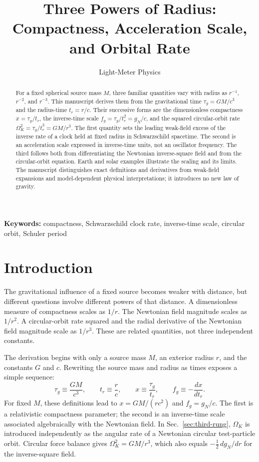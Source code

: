 \documentclass[12pt]{article}
\title{Three Powers of Radius:\\
Compactness, Acceleration Scale, and Orbital Rate}
\author{Light-Meter Physics}
\date{}
\begin{document}
\maketitle

\begin{abstract}
For a fixed spherical source mass $M$, three familiar quantities vary with radius as $r^{-1}$, $r^{-2}$, and $r^{-3}$. This manuscript derives them from the gravitational time $\tau_g=GM/c^3$ and the radius-time $t_r=r/c$. Their successive forms are the dimensionless compactness $x=\tau_g/t_r$, the inverse-time scale $f_g=\tau_g/t_r^2=g_N/c$, and the squared circular-orbit rate $\Omega_K^2=\tau_g/t_r^3=GM/r^3$. The first quantity sets the leading weak-field excess of the inverse rate of a clock held at fixed radius in Schwarzschild spacetime. The second is an acceleration scale expressed in inverse-time units, not an oscillator frequency. The third follows both from differentiating the Newtonian inverse-square field and from the circular-orbit equation. Earth and solar examples illustrate the scaling and its limits. The manuscript distinguishes exact definitions and derivatives from weak-field expansions and model-dependent physical interpretations; it introduces no new law of gravity.
\end{abstract}

\noindent\textbf{Keywords:} compactness, Schwarzschild clock rate, inverse-time scale, circular orbit, Schuler period

\section{Introduction}
\label{sec:introduction}

The gravitational influence of a fixed source becomes weaker with distance, but different questions involve different powers of that distance. A dimensionless measure of compactness scales as $1/r$. The Newtonian field magnitude scales as $1/r^2$. A circular-orbit rate squared and the radial derivative of the Newtonian field magnitude scale as $1/r^3$. These are related quantities, not three independent constants.

The derivation begins with only a source mass $M$, an exterior radius $r$, and the constants $G$ and $c$. Rewriting the source mass and radius as times exposes a simple sequence:
\begin{equation}
  \tau_g\equiv\frac{GM}{c^3},
  \qquad
  t_r\equiv\frac{r}{c},
  \qquad
  x\equiv\frac{\tau_g}{t_r},
  \qquad
  f_g\equiv-\frac{dx}{dt_r}.
  \label{eq:sequence-definitions}
\end{equation}
For fixed $M$, these definitions lead to $x=GM/(rc^2)$ and $f_g=g_N/c$. The first is a relativistic compactness parameter; the second is an inverse-time scale associated algebraically with the Newtonian field. In Sec.~\ref{sec:third-rung}, $\Omega_K$ is introduced independently as the angular rate of a Newtonian circular test-particle orbit. Circular force balance gives $\Omega_K^2=GM/r^3$, which also equals $-\tfrac12\,dg_N/dr$ for the inverse-square field.
\end{document}
